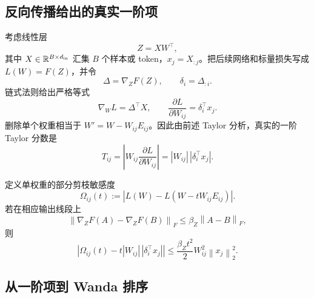 \documentclass[conference,a4paper]{IEEEtran}
\newcommand{\R}{\mathbb{R}}
\newcommand{\norm}[1]{\left\lVert #1\right\rVert}
\begin{document}
\subsection{反向传播给出的真实一阶项}

考虑线性层
\begin{equation}
Z=XW^\top,
\end{equation}
其中 $X\in\R^{B\times d_{\rm in}}$ 汇集 $B$ 个样本或 token，$x_j=X_{:j}$。把后续网络和标量损失写成 $L(W)=F(Z)$，并令
\begin{equation}
\Delta=\nabla_ZF(Z),\qquad\delta_i=\Delta_{:i}.
\end{equation}
链式法则给出严格等式
\begin{equation}
\nabla_WL=\Delta^\top X,\qquad
\frac{\partial L}{\partial W_{ij}}=\delta_i^\top x_j.
\label{eq:backprop}
\end{equation}
删除单个权重相当于 $W'=W-W_{ij}E_{ij}$。因此由前述 Taylor 分析，真实的一阶 Taylor 分数是
\begin{equation}
T_{ij}=\left|W_{ij}\frac{\partial L}{\partial W_{ij}}\right|
=|W_{ij}|\,|\delta_i^\top x_j|.
\label{eq:truefirst}
\end{equation}

定义单权重的部分剪枝敏感度
\begin{equation}
\Omega_{ij}(t):=|L(W)-L(W-tW_{ij}E_{ij})|.
\end{equation}
若在相应输出线段上
\begin{equation}
\norm{\nabla_ZF(A)-\nabla_ZF(B)}_F
\leq\beta_Z\norm{A-B}_F,
\end{equation}
则
\begin{equation}
\left|\Omega_{ij}(t)-t|W_{ij}|\,|\delta_i^\top x_j|\right|
\leq\frac{\beta_Zt^2}{2}W_{ij}^2\norm{x_j}_2^2.
\label{eq:layerremainder}
\end{equation}

\subsection{从一阶项到 Wanda 排序}
\end{document}
